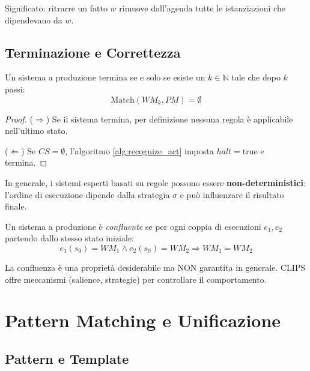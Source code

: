 Significato: ritrarre un fatto $w$ rimuove dall'agenda tutte le istanziazioni che dipendevano da $w$.

\subsection{Terminazione e Correttezza}

\begin{teorema}[Terminazione]
Un sistema a produzione termina se e solo se esiste un $k \in \mathbb{N}$ tale che dopo $k$ passi:
\begin{equation}
\text{Match}(WM_k, PM) = \emptyset
\end{equation}
\end{teorema}

\begin{proof}
($\Rightarrow$) Se il sistema termina, per definizione nessuna regola è applicabile nell'ultimo stato.

($\Leftarrow$) Se $CS = \emptyset$, l'algoritmo \ref{alg:recognize_act} imposta $halt = \text{true}$ e termina.
\end{proof}

\begin{warningbox}
In generale, i sistemi esperti basati su regole possono essere \textbf{non-deterministici}: l'ordine di esecuzione dipende dalla strategia $\sigma$ e può influenzare il risultato finale.
\end{warningbox}

\begin{teorema}[Confluenza]
Un sistema a produzione è \textit{confluente} se per ogni coppia di esecuzioni $e_1, e_2$ partendo dallo stesso stato iniziale:
\begin{equation}
e_1(s_0) = WM_1 \land e_2(s_0) = WM_2 \Rightarrow WM_1 = WM_2
\end{equation}
\end{teorema}

\begin{osservazione}
La confluenza è una proprietà desiderabile ma NON garantita in generale. CLIPS offre meccanismi (salience, strategie) per controllare il comportamento.
\end{osservazione}

\section{Pattern Matching e Unificazione}

\subsection{Pattern e Template}

